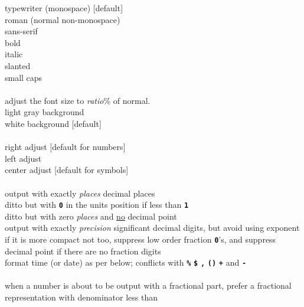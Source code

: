 \documentclass[12pt]{article}
\newcommand{\TT}[1]{{\tt \bfseries #1}}
\begin{document}
 typewriter (monospace) [default] \\
 roman (normal non-monospace) \\
 sans-serif \\
 bold \\
 italic \\
 slanted \\
 small caps \\
\ENDGROUP \\
 adjust the font size to {\em ratio}\% of normal.
\ENDGROUP \\
 light gray background \\
 white background [default] \\
\ENDGROUP \\
 right adjust [default for numbers] \\
 left adjust \\
 center adjust [default for symbols] \\
\ENDGROUP \\
    output with exactly {\em places} decimal places \\
    ditto but with \TT{0} in the units position if less than \TT{1} \\
    ditto but with zero {\em places} and \underline{no} decimal point \\
    output with exactly {\em precision} significant decimal digits,
    \GROUPNEWLINE
    but avoid using exponent if it is more compact not too,
    \GROUPNEWLINE
    suppress low order fraction \TT{0}'s,
    \GROUPNEWLINE
    and suppress decimal point if there are no fraction digits
    \GROUPNEWLINE
    [default is `\TT{p6}'] \\
    format time (or date) as per below; \GROUPNEWLINE
    conflicts with \TT{\%} \TT{\$} \TT{,} \TT{()} \TT{+} and \TT{-} \\
\ENDGROUP \\
    when a number is about to be output with a fractional part,
    prefer a fractional representation with denominator less than
\end{document}
